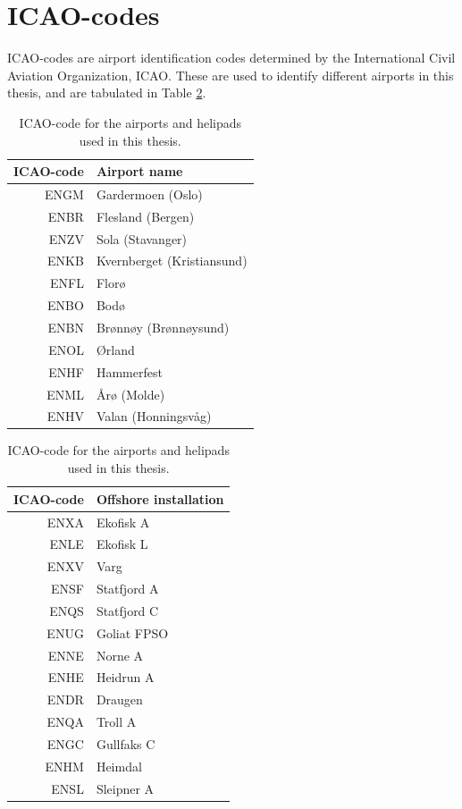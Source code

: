 \section{ICAO-codes}
ICAO-codes are airport identification codes determined by the International Civil Aviation Organization, ICAO. These are used to identify different airports in this thesis, and are tabulated in Table \ref{tab:ICAO-table}.
\begin{table}
    \begin{subtable}[h]{0.45\textwidth}
        \centering
         \begin{tabular}{r|l}
            ICAO-code & Airport name \\
            \hline
            ENGM & Gardermoen (Oslo) \\
            ENBR & Flesland (Bergen) \\
            ENZV & Sola (Stavanger)  \\
            ENKB & Kvernberget (Kristiansund) \\
            ENFL & Florø \\
            ENBO & Bodø \\
            ENBN & Brønnøy (Brønnøysund) \\
            ENOL & Ørland \\
            ENHF & Hammerfest \\
            ENML & Årø (Molde)\\
            ENHV & Valan (Honningsvåg)\\
        \end{tabular}
    \end{subtable}
    \hfill
    \begin{subtable}[h]{0.45\textwidth}
        \centering
        \begin{tabular}{r|l}
            ICAO-code & Offshore installation\\
            \hline
            ENXA &  Ekofisk A\\
            ENLE &  Ekofisk L\\
            ENXV &  Varg\\
            ENSF &  Statfjord A\\
            ENQS &  Statfjord C\\
            ENUG &  Goliat FPSO\\
            ENNE &  Norne A\\
            ENHE &  Heidrun A\\
            ENDR &  Draugen\\
            ENQA &  Troll A\\
            ENGC &  Gullfaks C\\
            ENHM &  Heimdal\\
            ENSL &  Sleipner A\\
        \end{tabular}
     \end{subtable}
    \caption{ICAO-code for the airports and helipads used in this thesis.}
    \label{tab:ICAO-table}
\end{table}